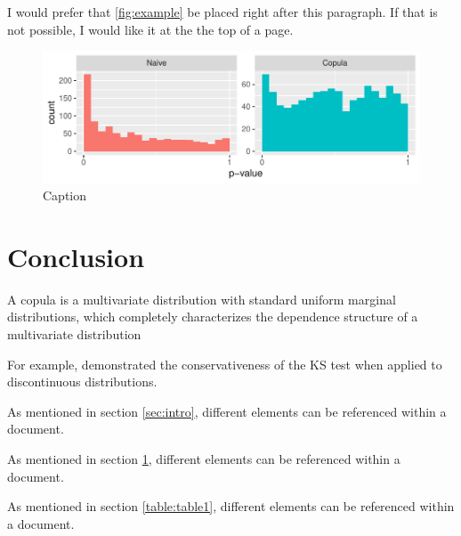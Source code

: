 \documentclass[12pt, letterpaper, titlepage]{article}
\begin{document}
I would prefer that \autoref{fig:example} be placed right after this paragraph.
If that is not possible, I would like it at the the top of a page.

\begin{figure}[ht]
  \includegraphics[width=\textwidth]{hist_ar1_D}
  \caption{Caption}
  \label{fig:example}
\end{figure}

\section{Conclusion}
\label{sec:conclusion}

A copula is a
multivariate distribution with standard uniform marginal distributions, which
completely characterizes the dependence structure of a multivariate
distribution \citep{Copula, Hofert}

For example, \citet{Noether} demonstrated the conservativeness of
the KS test when applied to discontinuous distributions.

As mentioned in section \ref{sec:intro}, different elements can be referenced within a document.

As mentioned in section \ref{fig:example}, different elements can be referenced within a document.

As mentioned in section \ref{table:table1}, different elements can be referenced within a document.



\end{document}
